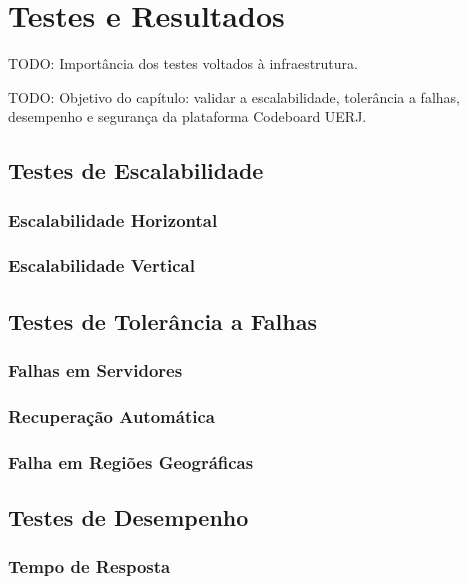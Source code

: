 
\section{Testes e Resultados}

TODO: Importância dos testes voltados à infraestrutura.

TODO: Objetivo do capítulo: validar a escalabilidade, tolerância a falhas, desempenho e segurança da plataforma Codeboard UERJ.

\subsection{Testes de Escalabilidade}

\subsubsection{Escalabilidade Horizontal}

\subsubsection{Escalabilidade Vertical}

\subsection{Testes de Tolerância a Falhas}

\subsubsection{Falhas em Servidores}

\subsubsection{Recuperação Automática}

\subsubsection{Falha em Regiões Geográficas}

\subsection{Testes de Desempenho}

\subsubsection{Tempo de Resposta}

